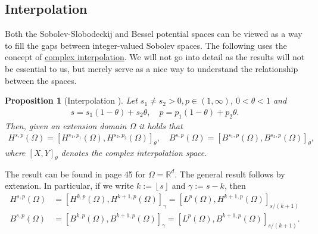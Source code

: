 \documentclass[
    a4paper,
    DIV=14,
    abstract=true,
    numbers=noenddot
]
{scrartcl}
\newtheorem{proposition}[theorem]{Proposition}
\theoremstyle{definition}
\newcommand{\R}{\mathbb{R}}
\begin{document}
\subsection{Interpolation}
Both the Sobolev-Slobodeckij and Bessel potential spaces can be viewed as a way to fill the gaps between integer-valued Sobolev spaces. The following uses the concept of \href{https://en.wikipedia.org/wiki/Interpolation_space}{complex interpolation}. We will not go into detail as the results will not be essential to us, but merely serve as a nice way to understand the relationship between the spaces.
\begin{proposition}[Interpolation ]\label{interpolation}
    Let $s_1 \neq s_2 >0, p \in (1, \infty)$, $0<\theta<1$ and
    \begin{align*}
        s=s_1(1-\theta)+s_2 \theta, \quad p=p_1(1-\theta)+p_2 \theta.
    \end{align*}
    Then, given an extension domain $\Omega$  it holds that
    \begin{align*}
        H^{s,p}(\Omega )=\left[H^{s_1,p_1}(\Omega), H^{s_2,p_2}(\Omega)\right]_{\theta},\quad B^{s,p}(\Omega )=\left[B^{s_1,p}(\Omega ), B^{s_2, p}(\Omega )\right]_\theta,
    \end{align*}
    where $[X,Y]_\theta$ denotes the complex interpolation space.
\end{proposition}
The result can be found in \cite{triebel1992theory} page 45 for $\Omega = \R^d$. The general result follows by extension. In particular, if we write $k:=\left\lfloor s \right\rfloor$ and $\gamma:=s-k$, then
\begin{align*}
    H^{s,p}(\Omega ) & =\left[H^{k,p}(\Omega), H^{k+1,p}(\Omega)\right]_{\gamma }= \left[L^p(\Omega ), H^{k+1,p}(\Omega)\right]_{s/(k+1) }  \\
    B^{s,p}(\Omega ) & =\left[B^{k,p}(\Omega), B^{k+1,p}(\Omega)\right]_{\gamma }= \left[L^p(\Omega ), B^{k+1,p}(\Omega)\right]_{s/(k+1) }.
\end{align*}
\end{document}
